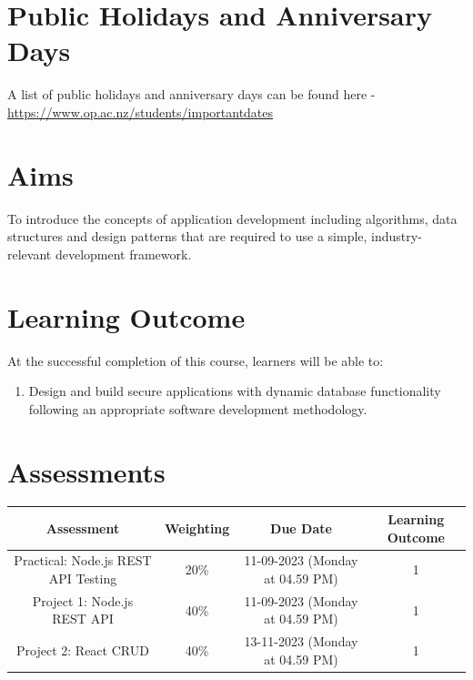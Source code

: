 \documentclass{article}
\begin{document}
\section*{Public Holidays and Anniversary Days}
A list of public holidays and anniversary days can be found here - \href{https://www.op.ac.nz/students/importantdates}{https://www.op.ac.nz/students/importantdates}

\section*{Aims}
To introduce the concepts of application development including algorithms, data structures and design patterns that are required to use a simple, industry-relevant development framework.

\section*{Learning Outcome}
At the successful completion of this course, learners will be able to:
\begin{enumerate}
	\item Design and build secure applications with dynamic database functionality following an appropriate software development methodology.
\end{enumerate}

\section*{Assessments}
\renewcommand{\arraystretch}{1.5}
\begin{tabular}{|c|c|c|c|}
	\hline
	\textbf{Assessment}                                 & \textbf{Weighting} & \textbf{Due Date}            & \textbf{Learning Outcome} \\ \hline
	\small Practical: Node.js REST API Testing & \small 20\%        & \small 11-09-2023 (Monday at 04.59 PM)   & \small 1                   \\ \hline
	\small Project 1: Node.js REST API                  & \small 40\%        & \small \small 11-09-2023 (Monday at 04.59 PM) & \small 1                   \\ \hline
	\small Project 2: React CRUD                        & \small 40\%        & \small 13-11-2023 (Monday at 04.59 PM)  & \small 1                   \\ \hline
\end{tabular}
\end{document}
